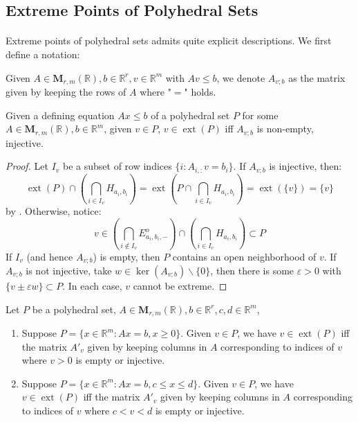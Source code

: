 \subsection{Extreme Points of Polyhedral Sets}

\paragraph{}Extreme points of polyhedral sets admits quite explicit descriptions. We first define a notation:

\begin{defn}\label{defn:017-submatrix}
	Given $A\in \mathbf{M}_{r,m}(\mathbb{R}),b\in \mathbb{R}^r,v\in \mathbb{R}^m$ with $Av\leq b$, we denote $A_{v; b}$ as the matrix given by keeping the rows of $A$ where "$=$" holds.
\end{defn}

\begin{prop}\label{prop:017-characterization-polyhedral-extreme}
	Given a defining equation $Ax\leq b$ of a polyhedral set $P$ for some $A\in \mathbf{M}_{r,m}(\mathbb{R}),b\in \mathbb{R}^m$, given $v\in P$, $v\in \operatorname{ext}(P)$ iff $A_{v; b}$ is non-empty, injective.
\end{prop}

\begin{proof}
	Let $I_v$ be a subset of row indices $\{i:A_{i,:}v=b_i\}$. If $A_{v; b}$ is injective, then:
	\[
		\operatorname{ext}(P)\cap\left(\bigcap_{i\in I_v}H_{a_i,b_i}\right)=
		\operatorname{ext}\left(P\cap\bigcap_{i\in I_v}H_{a_i,b_i}\right)=\operatorname{ext}\left(\{v\}\right)=\{v\}
	\]
	by . Otherwise, notice:
	\[
		v\in\left(\bigcap_{i\notin I_v}E_{a_i,b_i,-}^o\right)\cap\left(\bigcap_{i\in I_v}H_{a_i,b_i}\right)\subset P
	\]
	If $I_v$ (and hence $A_{v;b}$) is empty, then $P$ contains an open neighborhood of $v$. If $A_{v;b}$ is not injective, take $w\in \operatorname{ker}(A_{v;b})\smallsetminus\{0\}$, then there is some $\varepsilon >0$ with $\{v\pm \varepsilon w\}\subset P$. In each case, $v$ cannot be extreme.
\end{proof}

\begin{coro}[Variants]\label{coro:017-char-variants}
	Let $P$ be a polyhedral set, $A\in \mathbf{M}_{r,m}(\mathbb{R}),b\in \mathbb{R}^r,c,d\in \mathbb{R}^m$,
	\begin{enumerate}[label=(\alph*)]
		\item Suppose $P=\{x\in \mathbb{R}^m:Ax=b,x\geq 0\}$. Given $v\in P$, we have $v\in \operatorname{ext}(P)$ iff the matrix $A'_v$ given by keeping columns in $A$ corresponding to indices of $v$ where $v> 0$ is empty or injective.
		\item Suppose $P=\{x\in \mathbb{R}^m:Ax=b,c\leq x\leq d\}$. Given $v\in P$, we have $v\in \operatorname{ext}(P)$ iff the matrix $A'_v$ given by keeping columns in $A$ corresponding to indices of $v$ where $c<v<d$ is empty or injective.
	\end{enumerate}
\end{coro}

